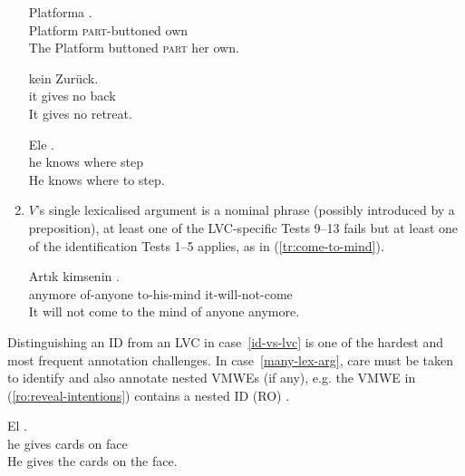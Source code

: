 \documentclass[output=paper,modfonts]{langscibook}
\begin{document}
\begin{enumerate}
\ea \label{pl:dopiac-swego}
\settowidth {}
\gll Platforma  . \\
Platform \textsc{part}-buttoned own\\ 
\glt The Platform buttoned \textsc{part} her own. 
\z

\ea \label{de:es-gibt}
\settowidth {}
\gll  {}   kein Zurück.\\
it gives no back\\ 
\glt It gives no retreat. 
\z

\ea \label{pt:saber-onde-pisar}
\settowidth {}
\gll Ele  \underline{} \underline{}. \\
he knows where step\\ 
\glt He knows where to step. 
\z

\item\label{id-vs-lvc} $V$'s single lexicalised argument is a nominal phrase (possibly introduced by a preposition), at least one of the  LVC-specific Tests 9--13 fails but at least one of the identification Tests 1--5 applies, as in (\ref{tr:come-to-mind}).

\ea \label{tr:come-to-mind}
\settowidth {}
\gll Artık kimsenin  .\\
anymore of-anyone to-his-mind it-will-not-come\\ 
\glt It will not come to the mind of anyone anymore. 
\z

\end{enumerate}

Distinguishing an ID from an LVC in case~\ref{id-vs-lvc} is one of the hardest and most frequent annotation challenges.  In case~\ref{many-lex-arg}, care must be taken to identify and also annotate nested VMWEs (if any), e.g. the VMWE in (\ref{ro:reveal-intentions}) 
contains a nested ID (RO) . 

\ea \label{ro:reveal-intentions}
\settowidth {}
\gll El    . \\
he gives cards on face\\ 
\glt He gives the cards on the face. 
\z
\end{document}
